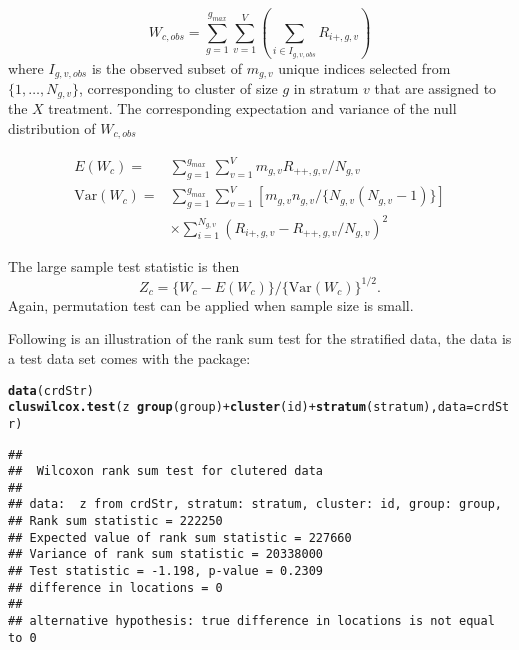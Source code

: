 \documentclass[nojss]{jss}\usepackage[]{graphicx}\usepackage[]{color}
\makeatletter
\newcommand{\hlopt}[1]{\textcolor[rgb]{0,0,0}{#1}}%
\newcommand{\hlstd}[1]{\textcolor[rgb]{0.345,0.345,0.345}{#1}}%
\newcommand{\hlkwc}[1]{\textcolor[rgb]{0.333,0.667,0.333}{#1}}%
\newcommand{\hlkwd}[1]{\textcolor[rgb]{0.737,0.353,0.396}{\textbf{#1}}}%
\newenvironment{kframe}{%
 \def\at@end@of@kframe{}%
 \ifinner\ifhmode%
  \def\at@end@of@kframe{\end{minipage}}%
  \begin{minipage}{\columnwidth}%
 \fi\fi%
 \def\FrameCommand##1{\hskip\@totalleftmargin \hskip-\fboxsep
 \colorbox{shadecolor}{##1}\hskip-\fboxsep
     \hskip-\linewidth \hskip-\@totalleftmargin \hskip\columnwidth}%
 \MakeFramed {\advance\hsize-\width
   \@totalleftmargin\z@ \linewidth\hsize
   \@setminipage}}%
 {\par\unskip\endMakeFramed%
 \at@end@of@kframe}
\newenvironment{knitrout}{}{} %
\makeatother
\begin{document}
\begin{equation}
\label{eq: srank}
W_{c, obs} = \sum_{g=1}^{g_{max}}\sum_{v=1}^{V}\left(\sum_{i\in I_{g,v,obs}}R_{i+,g,v}\right)
\end{equation}
where $I_{g, v, obs}$ is the observed subset of $m_{g,v}$
unique indices selected from
$\{1, \ldots, N_{g,v}\}$,
corresponding to cluster of
size $g$ in stratum $v$ that are assigned to the $X$ treatment.
The corresponding expectation and variance of the null
distribution of $W_{c, obs}$

\begin{align*}
E(W_c)=& \sum_{g=1}^{g_{max}}\sum^V_{v=1}m_{g,v}R_{++,g,v}/N_{g,v}\\
\text{Var}(W_c)=& \sum_{g=1}^{g_{max}}\sum_{v=1}^V[m_{g,v}n_{g,v}/\{N_{g,v}(N_{g,v} - 1)\}]\\
&\times\sum_{i=1}^{N_{g,v}}(R_{i+, g, v} - R_{++, g, v}/N_{g,v})^2
\end{align*}

The large sample test statistic is then
\begin{equation}
Z_c = \{W_c - E(W_c)\}/\{\text{Var}(W_c)\}^{1/2}.
\end{equation}
Again, permutation test can be applied when sample size is small.

Following is an illustration of the rank sum test for the
stratified data, the  data is a test data set
comes with the package:
\begin{knitrout}
\color{fgcolor}\begin{kframe}
\begin{alltt}
\hlkwd{data}\hlstd{(crdStr)}
\hlkwd{cluswilcox.test}\hlstd{(z} \hlopt{~} \hlkwd{group}\hlstd{(group)} \hlopt{+} \hlkwd{cluster}\hlstd{(id)} \hlopt{+} \hlkwd{stratum}\hlstd{(stratum),} \hlkwc{data} \hlstd{= crdStr)}
\end{alltt}
\begin{verbatim}
## 
## 	Wilcoxon rank sum test for clutered data
## 
## data:  z from crdStr, stratum: stratum, cluster: id, group: group,
## Rank sum statistic = 222250
## Expected value of rank sum statistic = 227660
## Variance of rank sum statistic = 20338000
## Test statistic = -1.198, p-value = 0.2309
## difference in locations = 0
## 
## alternative hypothesis: true difference in locations is not equal to 0
\end{verbatim}
\end{kframe}
\end{knitrout}
\end{document}
